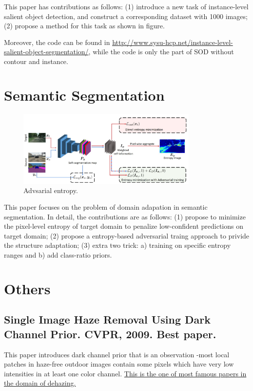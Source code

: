 \documentclass[10pt,onecolumn]{book}
\begin{document}
This paper has contributions as follows:
(1) introduce a new task of instance-level salient object detection, and construct a corresponding dataset with 1000 images;
(2) propose a method for this task as shown in figure.

Moreover, the code can be found in \url{http://www.sysu-hcp.net/instance-level-salient-object-segmentation/}, while the code is only the part of SOD without contour and instance.

\chapter{Semantic Segmentation}
\begin{figure}[h]
\centering
\includegraphics[width=0.8\textwidth]{figures_paper_reading/ADVENT_Adversarial_Entropy_Minimization_for_Domain_Adaptation_in_Semantic_Segmentation_CVPR2019.png}
\caption{Advsarial entropy.}
\label{fig}
\end{figure}
This paper focuses on the problem of domain adapation in semantic segmentation. In detail, the contributions are as follows: (1) propose to minimize the pixel-level entropy of target domain to penalize low-confident predictions on target domain; (2) propose a entropy-based adversarial traing approach to privide the structure adaptation; (3) extra two trick: a) training on specific entropy ranges and b) add class-ratio priors.

\chapter{Others}
\section{Single Image Haze Removal Using Dark Channel Prior. CVPR, 2009. Best paper.}
This paper introduces dark channel prior that is an observation -most local patches in haze-free outdoor images contain some pixels which have very low intensities in at least one color channel. \uline{This is the one of most famous papers in the domain of dehazing.} 
\end{document}
